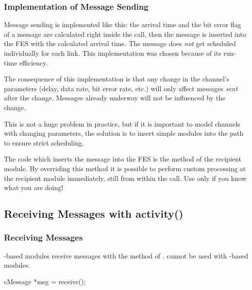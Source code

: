 \subsubsection{Implementation of Message Sending}
\label{sec:simple-modules:implementation-of-message-sending}

Message sending is implemented like this: the arrival time
and the bit error flag of a message are calculated right inside
the  call, then the message is inserted into the FES
with the calculated arrival time. The message does \textit{not} get scheduled
individually for each link. This implementation was chosen because of its
run-time efficiency.

\begin{note}
   The consequence of this implementation is that any change in the
   channel's parameters (delay, data rate, bit error rate, etc.) will only affect
   messages \textit{sent} after the change. Messages already underway will not
   be influenced by the change.

   This is not a huge problem in practice, but if it is important to model
   channels with changing parameters, the solution is to insert simple modules
   into the path to ensure strict scheduling.
\end{note}

The code which inserts the message into the FES is the 
method of the recipient module. By overriding this method it is possible
to perform custom processing at the recipient module immediately, still
from within the  call. Use only if you know what you are doing!


\subsection{Receiving Messages with activity()}
\label{sec:simple-modules:receiving-with-activity}

\subsubsection{Receiving Messages}
\label{sec:simple-modules:receive}

-based modules receive messages with the 
method of .  cannot be used with
-based modules.

\begin{cpp}
cMessage *msg = receive();
\end{cpp}

